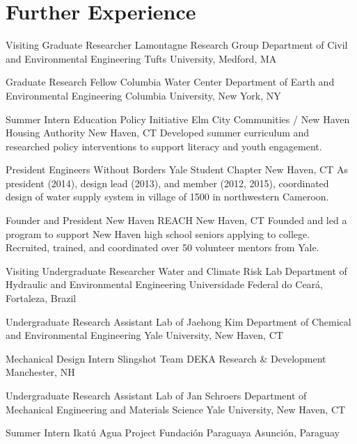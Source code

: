 \section{Further Experience}

{Visiting Graduate Researcher}
{Lamontagne Research Group}
{Department of Civil and Environmental Engineering}
{Tufts University, Medford, MA
}{}

{Graduate Research Fellow}
{Columbia Water Center}
{Department of Earth and Environmental Engineering}
{Columbia University, New York, NY}
{}

{Summer Intern}
{Education Policy Initiative}
{Elm City Communities / New Haven Housing Authority}
{New Haven, CT}
{Developed summer curriculum and researched policy interventions to support literacy and youth engagement.}

{President}
{Engineers Without Borders}
{Yale Student Chapter}
{New Haven, CT}
{As president (2014), design lead (2013), and member (2012, 2015), coordinated design of water supply system in village of 1500 in northwestern Cameroon.}

{Founder and President}
{New Haven REACH}
{}
{New Haven, CT}
{Founded and led a program to support New Haven high school seniors applying to college. Recruited, trained, and coordinated over 50 volunteer mentors from Yale.}

{Visiting Undergraduate Researcher}
{Water and Climate Risk Lab}
{Department of Hydraulic and Environmental Engineering}
{Universidade Federal do Ceará, Fortaleza, Brazil}
{}

{Undergraduate Research Assistant}
{Lab of Jaehong Kim}
{Department of Chemical and Environmental Engineering}
{Yale University, New Haven, CT}
{}

{Mechanical Design Intern}
{Slingshot Team}
{DEKA Research \& Development}
{Manchester, NH}
{}

{Undergraduate Research Assistant}
{Lab of Jan Schroers}
{Department of Mechanical Engineering and Materials Science}
{Yale University, New Haven, CT}
{}

{Summer Intern}
{Ikatú Agua Project}
{Fundación Paraguaya}
{Asunción, Paraguay}
{}

